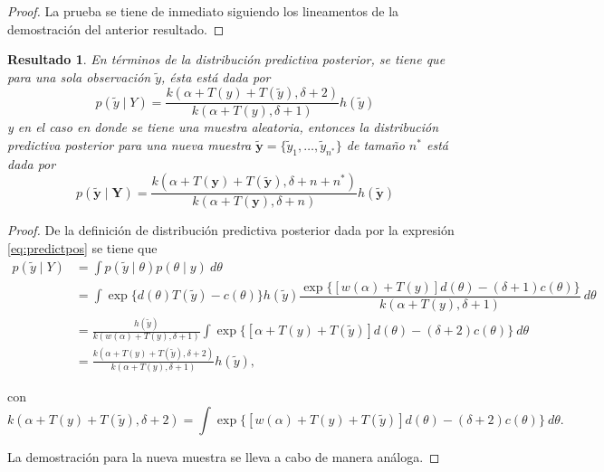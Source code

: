 \documentclass[
  spanish,
]{book}
\newtheorem{proposition}{Resultado}[chapter]
\theoremstyle{definition}
\theoremstyle{definition}
\theoremstyle{definition}
\theoremstyle{remark}
\begin{document}
\begin{proof}
\iffalse{} {Prueba. } \fi{}La prueba se tiene de inmediato siguiendo los lineamentos de la demostración del anterior resultado.
\end{proof}

\begin{proposition}
\protect\hypertarget{prp:unnamed-chunk-13}{}{\label{prp:unnamed-chunk-13} }En términos de la distribución predictiva posterior, se tiene que para una sola observación \(\tilde{y}\), ésta está dada por
\begin{equation}
p(\tilde{y} \mid Y)=\frac{k(\alpha+T(y)+T(\tilde{y}),\delta+2)}{k(\alpha+T(y),\delta+1)}h(\tilde{y})
\end{equation}
y en el caso en donde se tiene una muestra aleatoria, entonces la distribución predictiva posterior para una nueva muestra \(\tilde{\mathbf{y}}=\{\tilde{y}_1,\ldots,\tilde{y}_{n^*}\}\) de tamaño \(n^*\) está dada por
\begin{equation}
p(\tilde{\mathbf{y}} \mid \mathbf{Y})=
\frac{k(\alpha+T(\mathbf{y})+T(\tilde{\mathbf{y}}),\delta+n+n^*)}
{k(\alpha+T(\mathbf{y}),\delta+n)}h(\tilde{\mathbf{y}})
\end{equation}
\end{proposition}

\begin{proof}
\iffalse{} {Prueba. } \fi{}De la definición de distribución predictiva posterior dada por la expresión \eqref{eq:predictpos} se tiene que
\begin{align*}
p(\tilde{y} \mid Y)&=\int p(\tilde{y} \mid \theta)p(\theta \mid y)\ d\theta\\
&=\int \exp\{d(\theta)T(\tilde{y})-c(\theta)\}h(\tilde{y})\dfrac{\exp\{[w(\alpha)+T(y)]d(\theta)-(\delta+1)c(\theta)\}}{k(\alpha+T(y),\delta+1)}\ d\theta\\
&=\frac{h(\tilde{y})}{k(w(\alpha)+T(y),\delta+1)}\int \exp\{[\alpha+T(y)+T(\tilde{y})]d(\theta)-(\delta+2)c(\theta)\}\ d\theta\\
&=\frac{k(\alpha+T(y)+T(\tilde{y}),\delta+2)}{k(\alpha+T(y),\delta+1)}h(\tilde{y}),
\end{align*}

con
\begin{equation*}
k(\alpha+T(y)+T(\tilde{y}),\delta+2)=\int \exp\{[w(\alpha)+T(y)+T(\tilde{y})]d(\theta)-(\delta+2)c(\theta)\}\ d\theta.
\end{equation*}

La demostración para la nueva muestra se lleva a cabo de manera análoga.
\end{proof}
\end{document}
